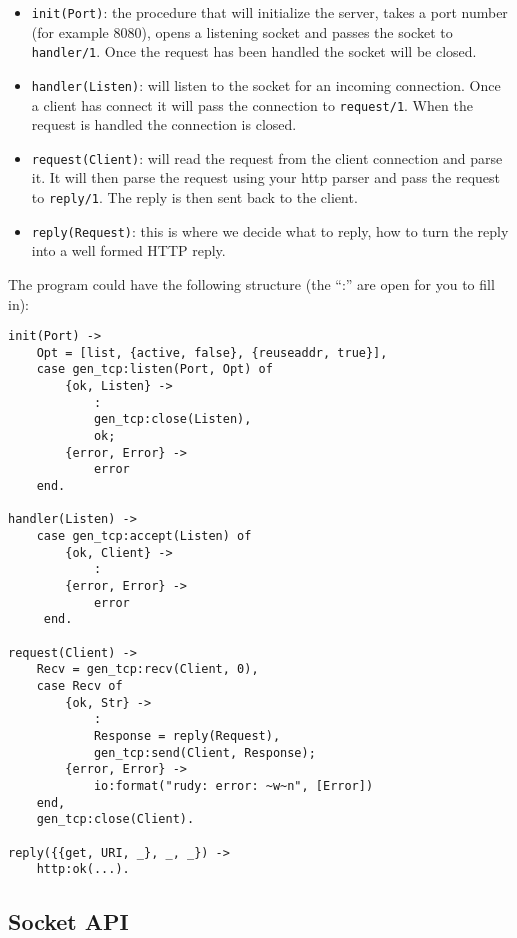 \documentclass[a4paper, 11pt]{article}
\begin{document}
\begin{itemize}
\item {\tt init(Port)}: the procedure that will initialize the server, takes a
port number (for example 8080), opens a listening socket and passes the
socket to {\tt handler/1}. Once the request has been handled the socket
will be closed.

\item {\tt handler(Listen)}: will listen to the socket for an incoming
connection. Once a client has connect it will pass the connection to
{\tt request/1}. When the request is handled the connection is closed.

\item {\tt request(Client)}: will read the request from the client
connection and parse it. It will then parse the request using your
http parser and pass the request to {\tt reply/1}. The reply is then
sent back to the client.

\item {\tt reply(Request)}: this is where we decide what to
reply, how to turn the reply into a well formed HTTP reply.
\end{itemize}

The program could have the following structure (the ``:'' are open for you to fill in):

\begin{verbatim}
init(Port) ->
    Opt = [list, {active, false}, {reuseaddr, true}],
    case gen_tcp:listen(Port, Opt) of
        {ok, Listen} -> 
            :
            gen_tcp:close(Listen),
            ok;
        {error, Error} -> 
            error
    end.

handler(Listen) ->
    case gen_tcp:accept(Listen) of
        {ok, Client} ->
            :
        {error, Error} ->
            error
     end.

request(Client) ->
    Recv = gen_tcp:recv(Client, 0),
    case Recv of
        {ok, Str} ->
            :
            Response = reply(Request),
            gen_tcp:send(Client, Response);
        {error, Error} ->
            io:format("rudy: error: ~w~n", [Error])
    end,
    gen_tcp:close(Client).
    
reply({{get, URI, _}, _, _}) ->    
    http:ok(...).
\end{verbatim}


\subsection{Socket API}
\end{document}
